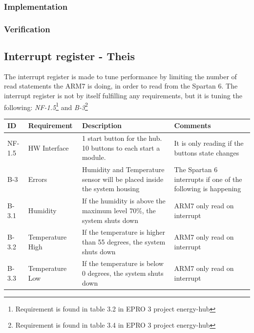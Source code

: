 \subsubsection{Implementation}
%
%
\subsubsection{Verification}
%
%



\subsection{Interrupt register - Theis}
The interrupt register is made to tune performance by limiting the number of read statements the ARM7 is doing, in order to read from the Spartan 6. The interrupt register is not by itself fulfilling any requirements, but it is tuning the following: \textit{NF-1.5}\footnote{Requirement is found in table 3.2 in EPRO 3 project energy-hub} and \textit{B-3}\footnote{Requirement is found in table 3.4 in EPRO 3 project energy-hub}
\begin{table}[H]
\centering
	\begin{tabular}{|p{1.2cm}|p{2.3cm}|p{6cm}|p{6cm}|}
	\hline
	ID		& Requirement		& Description																& Comments\\\hline
	NF-1.5	& HW Interface		& 1 start button for the hub. 10 buttons to each start a module.			& It is only reading if the buttons state changes\\\hline
	B-3		& Errors			& Humidity and Temperature sensor will be placed inside the system housing	& The Spartan 6 interrupts if one of the following is happening\\\hline
	B-3.1	& Humidity			& If the humidity is above the maximum level 70\%, the system shuts down	& ARM7 only read on interrupt\\\hline
	B-3.2	& Temperature High	& If the temperature is higher than 55 degrees, the system shuts down		& ARM7 only read on interrupt\\\hline
	B-3.3	& Temperature Low	& If the temperature is below 0 degrees, the system shuts down				& ARM7 only read on interrupt\\\hline
	\end{tabular}
\end{table}
